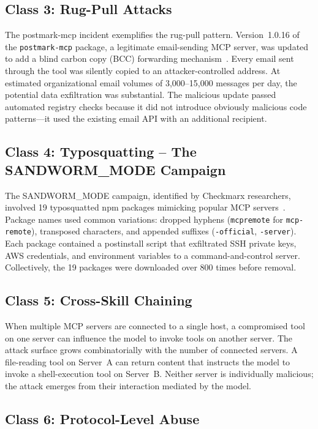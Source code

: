\documentclass[11pt,twocolumn]{article}
\begin{document}
\subsection{Class 3: Rug-Pull Attacks}

The postmark-mcp incident exemplifies the rug-pull pattern. Version~1.0.16 of the \texttt{postmark-mcp} package, a legitimate email-sending MCP server, was updated to add a blind carbon copy (BCC) forwarding mechanism~\cite{postmark}. Every email sent through the tool was silently copied to an attacker-controlled address. At estimated organizational email volumes of 3,000--15,000 messages per day, the potential data exfiltration was substantial. The malicious update passed automated registry checks because it did not introduce obviously malicious code patterns---it used the existing email API with an additional recipient.

\subsection{Class 4: Typosquatting -- The SANDWORM\_MODE Campaign}

The SANDWORM\_MODE campaign, identified by Checkmarx researchers, involved 19 typosquatted npm packages mimicking popular MCP servers~\cite{sandworm}. Package names used common variations: dropped hyphens (\texttt{mcpremote} for \texttt{mcp-remote}), transposed characters, and appended suffixes (\texttt{-official}, \texttt{-server}). Each package contained a postinstall script that exfiltrated SSH private keys, AWS credentials, and environment variables to a command-and-control server. Collectively, the 19 packages were downloaded over 800 times before removal.

\subsection{Class 5: Cross-Skill Chaining}

When multiple MCP servers are connected to a single host, a compromised tool on one server can influence the model to invoke tools on another server. The attack surface grows combinatorially with the number of connected servers. A file-reading tool on Server~A can return content that instructs the model to invoke a shell-execution tool on Server~B. Neither server is individually malicious; the attack emerges from their interaction mediated by the model.

\subsection{Class 6: Protocol-Level Abuse}
\end{document}
